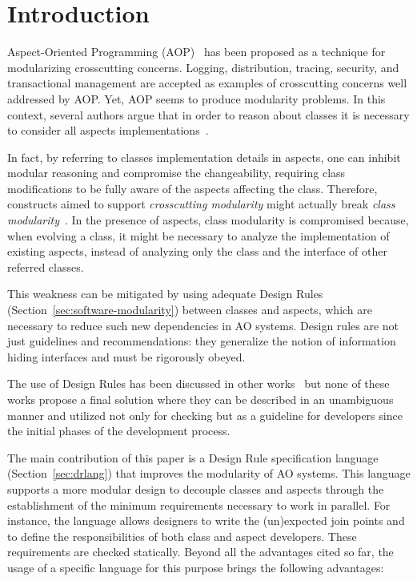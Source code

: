 \section{Introduction}


Aspect-Oriented Programming (AOP)~\cite{kiczales-ecoop-1997} has
been proposed as a technique for modularizing crosscutting concerns.
Logging, distribution, tracing, security, and transactional
management are accepted as examples of crosscutting concerns well
addressed by AOP. Yet, AOP seems to produce modularity problems. In
this context, several authors argue that in order to reason about
classes it is necessary to consider all aspects
implementations~\cite{sullivan-sigsoft-2005, leavens-observers-2002,
steiman-sigplan-2006}.

In fact, by referring to classes implementation details in aspects,
one can inhibit modular reasoning and compromise the changeability,
requiring class modifications to be fully aware of the aspects
affecting the class. Therefore, constructs aimed to support
\emph{crosscutting modularity} might actually break \emph{class
modularity}~\cite{ribeiro-sbes-07}. In the presence of aspects,
class modularity is compromised because, when evolving a class, it
might be necessary to analyze the implementation of existing
aspects, instead of analyzing only the class and the interface of
other referred classes.

This weakness can be mitigated by using adequate Design Rules
(Section~\ref{sec:software-modularity}) between classes and aspects,
which are necessary to reduce such new dependencies in AO systems.
Design rules are not just guidelines and recommendations: they
generalize the notion of information hiding interfaces and must be
rigorously obeyed.

The use of Design Rules has been discussed in other
works~\cite{sullivan-fse-2005, vlopes-aosd-2005, lopes-taosd-2006}
but none of these works propose a final solution where they can be
described in an unambiguous manner and utilized not only for
checking but as a guideline for developers since the initial phases
of the development process.

The main contribution of this paper is a Design Rule specification
language (Section~\ref{sec:drlang}) that improves the modularity of
AO systems. This language supports a more modular design to decouple
classes and aspects through the establishment of the minimum
requirements necessary to work in parallel. For instance, the
language allows designers to write the (un)expected join points and
to define the responsibilities of both class and aspect developers.
These requirements are checked statically. Beyond all the advantages
cited so far, the usage of a specific language for this purpose
brings the following advantages:

